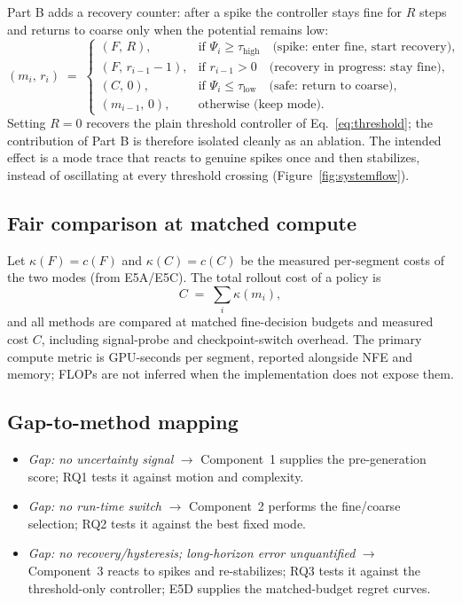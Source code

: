 \documentclass[11pt,a4paper]{article}
\begin{document}
Part B adds a recovery counter: after a spike the controller stays fine for $R$ steps and returns to coarse only when the potential remains low:
\begin{equation}
(m_i,\, r_i) \;=\;
\begin{cases}
(F,\, R),         & \text{if } \Psi_i \ge \tau_{\mathrm{high}} \quad \text{(spike: enter fine, start recovery)},\\[2pt]
(F,\, r_{i-1}-1), & \text{if } r_{i-1} > 0 \quad \text{(recovery in progress: stay fine)},\\[2pt]
(C,\, 0),         & \text{if } \Psi_i \le \tau_{\mathrm{low}} \quad \text{(safe: return to coarse)},\\[2pt]
(m_{i-1},\, 0),   & \text{otherwise (keep mode)}.
\end{cases}
\label{eq:recovery}
\end{equation}
Setting $R=0$ recovers the plain threshold controller of Eq.~\eqref{eq:threshold}; the contribution of Part B is therefore isolated cleanly as an ablation. The intended effect is a mode trace that reacts to genuine spikes once and then stabilizes, instead of oscillating at every threshold crossing (Figure~\ref{fig:systemflow}).

\subsection{Fair comparison at matched compute}

Let $\kappa(F) = c(F)$ and $\kappa(C) = c(C)$ be the measured per-segment costs of the two modes (from E5A/E5C). The total rollout cost of a policy is
\begin{equation}
C \;=\; \sum_{i} \kappa(m_i),
\label{eq:compute}
\end{equation}
and all methods are compared at matched fine-decision budgets and measured cost $C$, including signal-probe and checkpoint-switch overhead. The primary compute metric is GPU-seconds per segment, reported alongside NFE and memory; FLOPs are not inferred when the implementation does not expose them.

\subsection{Gap-to-method mapping}

\begin{itemize}[leftmargin=1.6em, itemsep=2pt]
\item \emph{Gap: no uncertainty signal} $\to$ Component~1 supplies the pre-generation score; RQ1 tests it against motion and complexity.
\item \emph{Gap: no run-time switch} $\to$ Component~2 performs the fine/coarse selection; RQ2 tests it against the best fixed mode.
\item \emph{Gap: no recovery/hysteresis; long-horizon error unquantified} $\to$ Component~3 reacts to spikes and re-stabilizes; RQ3 tests it against the threshold-only controller; E5D supplies the matched-budget regret curves.
\end{itemize}
\end{document}
